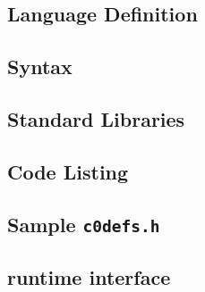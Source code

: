 
\begin{appendices}
\chapter{Language Definition}
\section{Syntax}


\end{appendices}

\begin{appendices}
\chapter{Standard Libraries}


\end{appendices}

\begin{appendices}
\chapter{Code Listing}

\section{Sample \tt c0defs.h}
\label{trans}


\section{\langname{} runtime interface}
\label{c0runtimeinterface}


\end{appendices}

